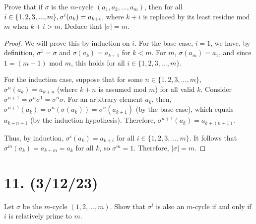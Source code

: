 \documentclass{article}
\begin{document}
Prove that if $\sigma$ is the $m$-cycle $(a_1, a_2, ..., a_m)$, then for all $i \in \{1, 2, 3, ..., m \},\\
\sigma^i(a_k) = a_{k + i}$, where $k + i$ is replaced by its least residue mod $m$ when $k + i > m$. Deduce that $|\sigma| = m$.

\begin{proof}
    We will prove this by induction on $i$. For the base case, $i = 1$, we have, by definition, $\sigma^1 = \sigma$ and $\sigma(a_k) = a_{k + 1}$ for $k < m$. For $m$, $\sigma(a_m) = a_1$, and since $1 = (m + 1)$ mod $m$, this holds for all $i \in \{1, 2, 3, ..., m \}$.

    For the induction case, suppose that for some $n \in \{1, 2, 3, ..., m \}$, $\sigma^n(a_k) = a_{k + n}$ (where $k + n$ is assumed mod $m$) for all valid $k$. Consider $\sigma^{n + 1} = \sigma^n \sigma^1 = \sigma^n \sigma$. For an arbitrary element $a_k$, then, $\sigma^{n + 1}(a_k) = \sigma^n(\sigma(a_k)) = \sigma^n(a_{k + 1})$ (by the base case), which equals $a_{k + n + 1}$ (by the induction hypothesis). Therefore, $\sigma^{n + 1}(a_k) = a_{k + (n + 1)}$.

    Thus, by induction, $\sigma^i(a_k) = a_{k + i}$ for all $i \in \{1, 2, 3, ..., m \}$. It follows that $\sigma^m(a_k) = a_{k + m} = a_{k}$ for all $k$, so $\sigma^m = 1$. Therefore, $|\sigma| = m$.
\end{proof}

\section*{11. (3/12/23)}

Let $\sigma$ be the $m$-cycle $(1, 2, ..., m)$. Show that $\sigma^i$ is also an $m$-cycle if and only if $i$ is relatively prime to $m$.
\end{document}
